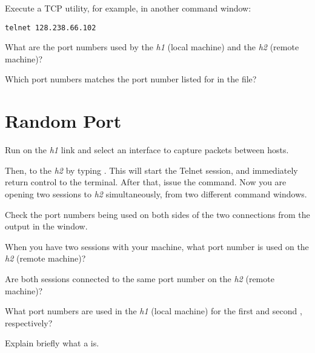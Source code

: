 \documentclass{../UTNetLab}
\begin{document}
Execute a TCP utility,  for example, in another command window:
\begin{lstlisting}
telnet 128.238.66.102
    \end{lstlisting}

\begin{report}
    \item What are the port numbers used by the \textit{h1} (local machine) and the \textit{h2} (remote machine)?

    \item Which port numbers matches the port number listed for  in the  file?
\end{report}

\section{Random Port}
Run  on the \textit{h1} link and select an interface to capture packets between hosts.

Then,  to the \textit{h2} by typing . This will start the Telnet session, and immediately return control to the terminal. 
After that, issue the  command.
Now you are opening two  sessions to \textit{h2} simultaneously, from two different command windows.

Check the port numbers being used on both sides of the two connections from the output in the  window.

\begin{report}
    \item When you have two  sessions with your machine, what port number is used on the \textit{h2} (remote machine)?

    \item Are both sessions connected to the same port number on the \textit{h2} (remote machine)?

    \item What port numbers are used in the \textit{h1} (local machine) for the first and second , respectively?

    \item Explain briefly what a  is.
\end{report}
\end{document}
